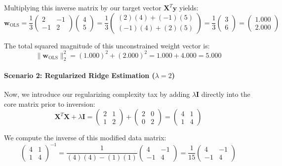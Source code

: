 \documentclass{article}
\begin{document}
Multiplying this inverse matrix by our target vector $\mathbf{X}^T\mathbf{y}$ yields:
\begin{equation}
\mathbf{w}_{\text{OLS}} = \frac{1}{3}\begin{pmatrix} 2 & -1 \\ -1 & 2 \end{pmatrix} \begin{pmatrix} 4 \\ 5 \end{pmatrix} = \frac{1}{3}\begin{pmatrix} (2)(4) + (-1)(5) \\ (-1)(4) + (2)(5) \end{pmatrix} = \frac{1}{3}\begin{pmatrix} 3 \\ 6 \end{pmatrix} = \begin{pmatrix} 1.000 \\ 2.000 \end{pmatrix}
\end{equation}

The total squared magnitude of this unconstrained weight vector is:
\begin{equation}
\|\mathbf{w}_{\text{OLS}}\|_2^2 = (1.000)^2 + (2.000)^2 = 1.000 + 4.000 = 5.000
\end{equation}

\paragraph{Scenario 2: Regularized Ridge Estimation ($\lambda = 2$)}
Now, we introduce our regularizing complexity tax by adding $\lambda \mathbf{I}$ directly into the core matrix prior to inversion:
\begin{equation}
\mathbf{X}^T\mathbf{X} + \lambda \mathbf{I} = \begin{pmatrix} 2 & 1 \\ 1 & 2 \end{pmatrix} + \begin{pmatrix} 2 & 0 \\ 0 & 2 \end{pmatrix} = \begin{pmatrix} 4 & 1 \\ 1 & 4 \end{pmatrix}
\end{equation}

We compute the inverse of this modified data matrix:
\begin{equation}
\begin{pmatrix} 4 & 1 \\ 1 & 4 \end{pmatrix}^{-1} = \frac{1}{(4)(4) - (1)(1)}\begin{pmatrix} 4 & -1 \\ -1 & 4 \end{pmatrix} = \frac{1}{15}\begin{pmatrix} 4 & -1 \\ -1 & 4 \end{pmatrix}
\end{equation}
\end{document}
